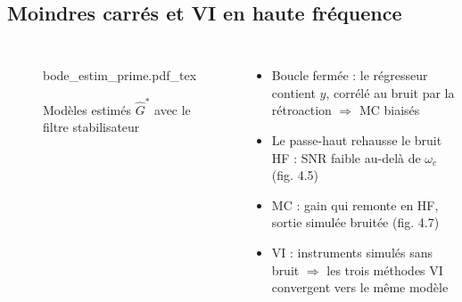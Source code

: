 \subsection*{Moindres carrés et VI en haute fréquence}
\begin{frame}

    \begin{columns}[c]
        \begin{figure}
            \centering
            {\fontsize{4.5pt}{5pt}\selectfont
                \def\svgwidth{\textwidth}
                {bode_estim_prime.pdf_tex}}
            \caption{Modèles estimés $\hat{G}^*$ avec le filtre stabilisateur}
        \end{figure}

        \begin{itemize}
            \item Boucle fermée : le régresseur contient $y$, \alert{corrélé au bruit} par la rétroaction $\Rightarrow$ MC biaisés
            \item Le passe-haut rehausse le bruit HF : SNR faible au-delà de $\omega_c$ (fig. 4.5)
            \item MC : gain qui \alert{remonte} en HF, sortie simulée bruitée (fig. 4.7)
            \item VI : instruments simulés sans bruit $\Rightarrow$ les trois méthodes VI \alert{convergent vers le même modèle}
        \end{itemize}
    \end{columns}
\end{frame}

